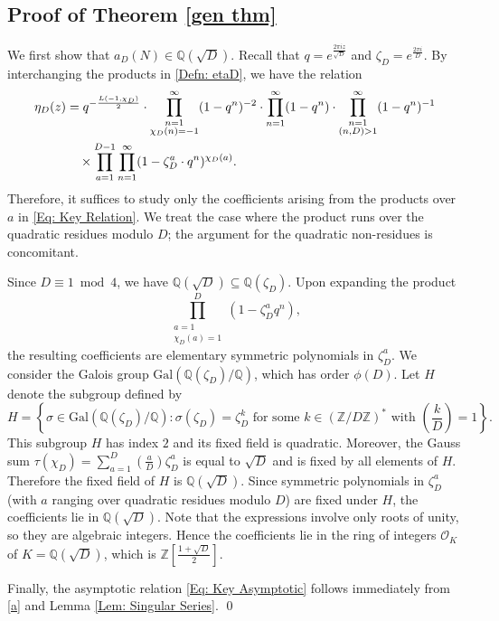\documentclass[11pt]{amsart}
\numberwithin{equation}{section}
\theoremstyle{remark}
\begin{document}
\subsection{Proof of Theorem \ref{gen thm}} We first show that $a_{D}(N) \in \mathbb{Q}(\sqrt{D})$. Recall that $q = e^{\frac{2 \pi i z}{\sqrt{D}}}$ and $\zeta_{D} = e^{\frac{2\pi i}{D}}$. By interchanging the products in \eqref{Defn: etaD}, we have the relation
\begin{align}\label{Eq: Key Relation}
\eta_{D}(z) & = q^{-\frac{L(-1,{\chi_{D}})}{2}} \cdot \prod_{\substack{n=1 \\ \chi_D(n) = -1 }}^\infty (1-q^n)^{-2} \cdot \prod_{\substack{n=1}}^\infty (1-q^n) \cdot \prod_{\substack{n=1 \\ (n,D)>1 }}^\infty (1-q^n)^{-1} \notag \\
&\quad \times \prod_{a=1}^{D-1} \prod_{n=1}^{\infty}(1-\zeta_{D}^a \cdot  q^n)^{{\chi_{D}}(a)}.
\end{align}
Therefore, it suffices to study only the coefficients arising from the products over $a$ in \eqref{Eq: Key Relation}. We treat the case where the product runs over the quadratic residues modulo $D$; the argument for the quadratic non-residues is concomitant.
\par
Since $D \equiv 1 \bmod{4}$, we have $\mathbb{Q}(\sqrt{D}) \subseteq \mathbb{Q}(\zeta_{D})$. Upon expanding the product
\[
\prod_{\substack{a=1 \\ \chi_D(a)=1}}^{D}(1 - \zeta_{D}^a q^n),
\]
the resulting coefficients are elementary symmetric polynomials in $\zeta_{D}^a$. We consider the Galois group $\mathrm{Gal}(\mathbb{Q}(\zeta_{D})/\mathbb{Q})$, which has order $\phi(D)$. Let $H$ denote the subgroup defined by
\[
H = \left\{ \sigma \in \mathrm{Gal}(\mathbb{Q}(\zeta_{D})/\mathbb{Q}) : \sigma(\zeta_{D}) = \zeta_{D}^k \text{ for some } k \in (\mathbb{Z}/D\mathbb{Z})^* \text{ with } \left( \frac{k}{D} \right) = 1 \right\}.
\]
This subgroup $H$ has index $2$ and its fixed field is quadratic. Moreover, the Gauss sum $\tau(\chi_D) = \sum_{a=1}^{D} \left( \frac{a}{D} \right) \zeta_{D}^a$
is equal to $\sqrt{D}$ and is fixed by all elements of $H$. Therefore the fixed field of $H$ is $\mathbb{Q}(\sqrt{D})$. Since symmetric polynomials in $\zeta_{D}^a$ (with $a$ ranging over quadratic residues modulo $D$) are fixed under $H$, the coefficients lie in $\mathbb{Q}(\sqrt{D})$. Note that the expressions involve only roots of unity, so they are algebraic integers. Hence the coefficients lie in the ring of integers $\mathcal{O}_K$ of \( K=\mathbb{Q}(\sqrt{D}) \), which is \( \mathbb{Z}\left[\frac{1 + \sqrt{D}}{2}\right] \).
\par
Finally, the asymptotic relation \eqref{Eq: Key Asymptotic} follows immediately from \eqref{a} and Lemma \ref{Lem: Singular Series}. \qed 
\end{document}
